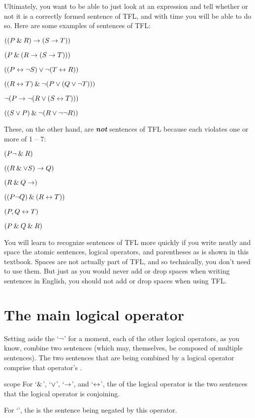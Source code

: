 Ultimately, you want to be able to just look at an expression and tell whether or not it is a correctly formed sentence of TFL, and with time you will be able to do so. Here are some examples of sentences of TFL:
\begin{earg}
\item $((P \mathbin{\&} R) \rightarrow (S \rightarrow T))$
\item $(P \mathbin{\&} (R \rightarrow (S \rightarrow T)))$
\item $((P \leftrightarrow {\neg} S) \vee {\neg}(T \leftrightarrow R))$
\item $((R \leftrightarrow T) \mathbin{\&} {\neg}(P \vee (Q \vee {\neg} T)))$
\item ${\neg}(P \rightarrow {\neg}(R \vee (S \leftrightarrow T)))$
\item $((S \vee P) \mathbin{\&} {\neg}(R \vee {\neg}{\neg} R))$
\end{earg}
These, on the other hand, are \textit{\textbf{not}} sentences of TFL because each violates one or more of 1 -- 7:
\begin{earg}
\item $(P{\neg} \mathbin{\&} R)$
\item $((R \mathbin{\&} \vee S) \rightarrow Q)$
\item $(R \mathbin{\&} Q \rightarrow)$
\item $((P {\neg} Q) \mathbin{\&} (R \leftrightarrow T))$
\item $(P,Q \leftrightarrow T)$
\item $(P \mathbin{\&} Q \mathbin{\&} R)$
\end{earg}

You will learn to recognize sentences of TFL more quickly if you write neatly and space the atomic sentences, logical operators, and parentheses as is shown in this textbook. Spaces are not actually part of TFL, and so technically, you don't need to use them. But just as you would never add or drop spaces when writing sentences in English, you should not add or drop spaces when using TFL.


\section{The main logical operator}
\label{main_logical_operator}

Setting aside the `${\neg}$' for a moment, each of the other logical operators, as you know, combine two sentences (which may, themselves, be composed of multiple sentences). The two sentences that are being combined by a logical operator comprise that operator's . 

\begin{factboxy}{scope}
For `$\mathbin{\&}$', `$\vee$', `$\rightarrow$', and `$\leftrightarrow$', the  of the logical operator is the two sentences that the logical operator is conjoining. 
\smallskip

For `\enot', the  is the sentence being negated by this operator.
\end{factboxy}

